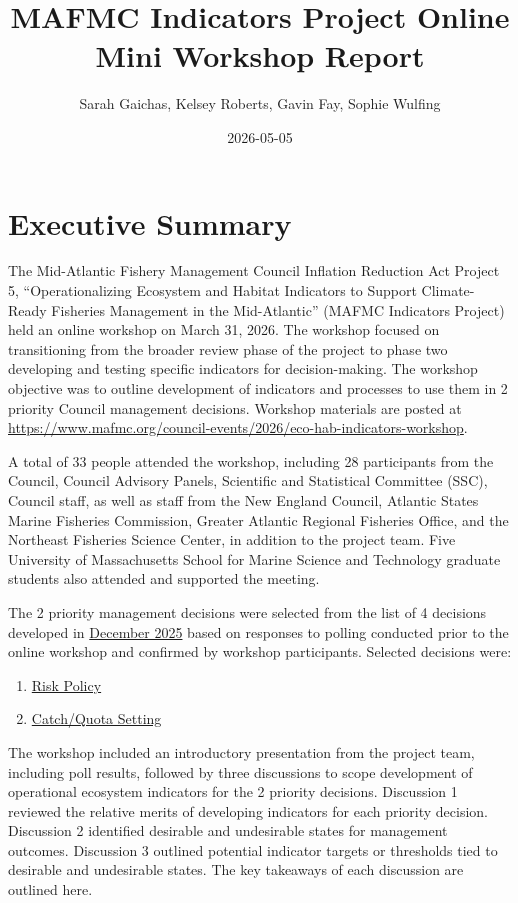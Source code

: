 \documentclass[
]{article}
\title{MAFMC Indicators Project Online Mini Workshop Report}
\author{Sarah Gaichas, Kelsey Roberts, Gavin Fay, Sophie Wulfing}
\date{2026-05-05}
\providecommand{\tightlist}{%
  \setlength{\itemsep}{0pt}\setlength{\parskip}{0pt}}
\begin{document}
\maketitle

\section{Executive Summary}\label{executive-summary}

The Mid-Atlantic Fishery Management Council Inflation Reduction Act Project 5, ``Operationalizing Ecosystem and Habitat Indicators to Support Climate-Ready Fisheries Management in the Mid-Atlantic'' (MAFMC Indicators Project) held an online workshop on March 31, 2026. The workshop focused on transitioning from the broader review phase of the project to phase two developing and testing specific indicators for decision-making. The workshop objective was to outline development of indicators and processes to use them in 2 priority Council management decisions. Workshop materials are posted at \url{https://www.mafmc.org/council-events/2026/eco-hab-indicators-workshop}.

A total of 33 people attended the workshop, including 28 participants from the Council, Council Advisory Panels, Scientific and Statistical Committee (SSC), Council staff, as well as staff from the New England Council, Atlantic States Marine Fisheries Commission, Greater Atlantic Regional Fisheries Office, and the Northeast Fisheries Science Center, in addition to the project team. Five University of Massachusetts School for Marine Science and Technology graduate students also attended and supported the meeting.

The 2 priority management decisions were selected from the list of 4 decisions developed in \href{https://www.mafmc.org/council-events/2025/dec-10/indicators-workshop}{December 2025} based on responses to polling conducted prior to the online workshop and confirmed by workshop participants. Selected decisions were:

\begin{enumerate}
\def\labelenumi{\arabic{enumi}.}
\tightlist
\item
  \href{https://www.mafmc.org/s/3_MiniWK_RiskPolicy.pdf}{Risk Policy}
\item
  \href{https://www.mafmc.org/s/4_MiniWK_CatchQuotas.pdf}{Catch/Quota Setting}
\end{enumerate}

The workshop included an introductory presentation from the project team, including poll results, followed by three discussions to scope development of operational ecosystem indicators for the 2 priority decisions. Discussion 1 reviewed the relative merits of developing indicators for each priority decision. Discussion 2 identified desirable and undesirable states for management outcomes. Discussion 3 outlined potential indicator targets or thresholds tied to desirable and undesirable states. The key takeaways of each discussion are outlined here.
\end{document}

